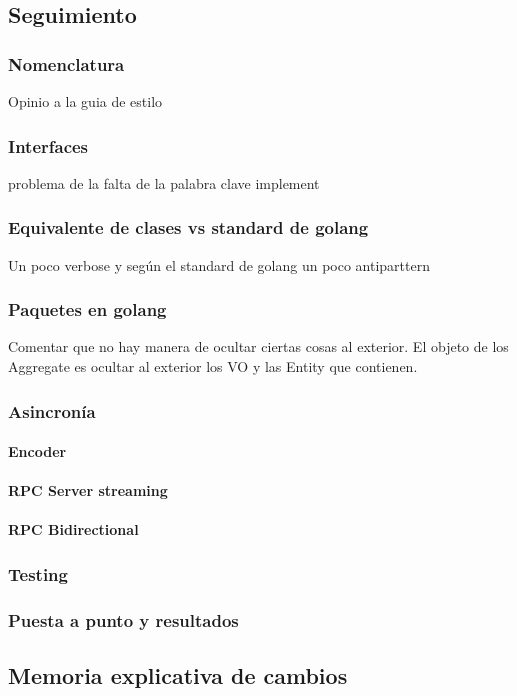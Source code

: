 \subsection{Seguimiento}\label{subsec:seguimiento}
    \subsubsection{Nomenclatura}
        Opinio a la guia de estilo
    \subsubsection{Interfaces}
        problema de la falta de la palabra clave implement
    \subsubsection{Equivalente de clases vs standard de golang}
        Un poco verbose y según el standard de golang un poco antiparttern
    \subsubsection{Paquetes en golang}
        Comentar que no hay manera de ocultar ciertas cosas al exterior. El objeto de los Aggregate es ocultar al exterior los VO y las Entity que contienen.
    \subsubsection{Asincronía}\label{subsec:asincronia}
        \paragraph{Encoder}
        \paragraph{RPC Server streaming}
        \paragraph{RPC Bidirectional}
    \subsubsection{Testing}
    \subsubsection{Puesta a punto y resultados}
\subsection{Memoria explicativa de cambios}\label{subsec:memoria explicativa de cambios}

